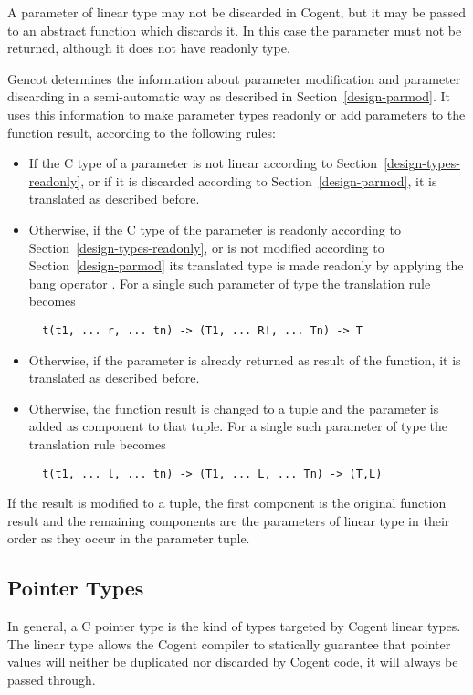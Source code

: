 A parameter of linear type may not be discarded in Cogent, but it may be passed to an abstract function which discards
it. In this case the parameter must not be returned, although it does not have readonly type.

Gencot determines the information about parameter modification and parameter discarding in a semi-automatic way
as described in Section~\ref{design-parmod}. It uses this information to make parameter types readonly or
add parameters to the function result, according to the following rules:
\begin{itemize}
\item If the C type of a parameter is not linear according to Section~\ref{design-types-readonly}, or if it
is discarded according to Section~\ref{design-parmod}, it is translated as described before.
\item Otherwise, if the C type of the parameter is readonly according to Section~\ref{design-types-readonly}, or
is not modified according to Section~\ref{design-parmod} its translated type is made readonly by applying the
bang operator \code{!}. For a single such parameter of type  the translation rule becomes
\begin{verbatim}
  t(t1, ... r, ... tn) -> (T1, ... R!, ... Tn) -> T
\end{verbatim}
\item Otherwise, if the parameter is already returned as result of the function, it is translated as described before.
\item Otherwise, the function result is changed to a tuple and the parameter is added as component to that tuple.
For a single such parameter of type  the translation rule becomes
\begin{verbatim}
  t(t1, ... l, ... tn) -> (T1, ... L, ... Tn) -> (T,L)
\end{verbatim}
\end{itemize}

If the result is modified to a tuple, the first component is the original function result and the remaining components
are the parameters of linear type in their order as they occur in the parameter tuple.

\subsection{Pointer Types}
\label{design-types-pointer}

In general, a C pointer type  is the kind of types targeted by Cogent linear types. The linear type 
allows the Cogent compiler to statically guarantee that pointer values will neither be duplicated nor 
discarded by Cogent code, it will always be passed through. 

